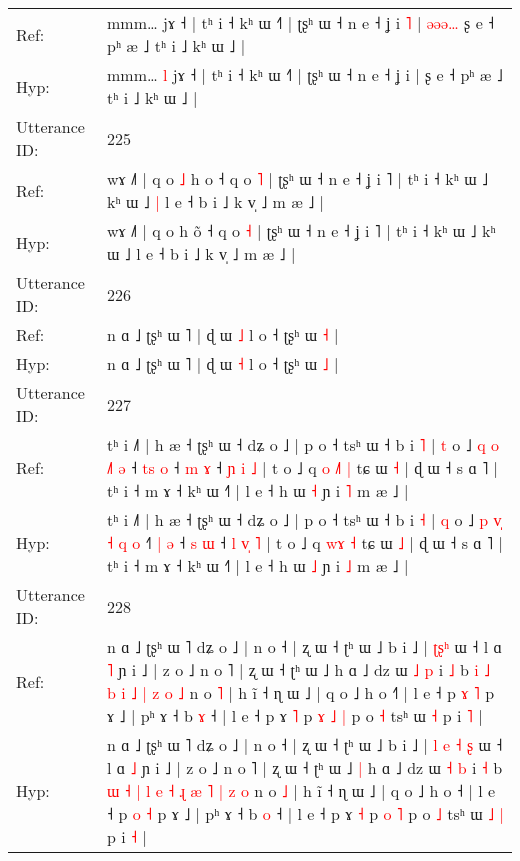 \documentclass[10pt]{article}
\DeclareRobustCommand{\hl}[1]{{\textcolor{red}{#1}}}
\begin{document}
\begin{longtable}{ll}
Ref: & mmm…\hl{}\hl{} jɤ ˧ | tʰ i ˧ kʰ ɯ ˧˥ | ʈʂʰ ɯ ˧ n e ˧ ʝ i\hl{ }\hl{˥} |\hl{ }\hl{ə}\hl{ə}\hl{ə}\hl{…} ʂ e ˧ pʰ æ ˩ tʰ i ˩ kʰ ɯ ˩ |
 \\
Hyp: & mmm…\hl{ }\hl{l} jɤ ˧ | tʰ i ˧ kʰ ɯ ˧˥ | ʈʂʰ ɯ ˧ n e ˧ ʝ i\hl{}\hl{} |\hl{}\hl{}\hl{}\hl{}\hl{} ʂ e ˧ pʰ æ ˩ tʰ i ˩ kʰ ɯ ˩ |
 \\
\midrule
Utterance ID: & 225 \\
Ref: & wɤ ˩˥ | q o\hl{ }\hl{˩} h o\hl{} ˧ q o \hl{˥} | ʈʂʰ ɯ ˧ n e ˧ ʝ i ˥ | tʰ i ˧ kʰ ɯ ˩ kʰ ɯ ˩\hl{ }\hl{|} l e ˧ b i ˩ k v̩ ˩ m æ ˩ |
 \\
Hyp: & wɤ ˩˥ | q o\hl{}\hl{} h o\hl{̃} ˧ q o \hl{˧} | ʈʂʰ ɯ ˧ n e ˧ ʝ i ˥ | tʰ i ˧ kʰ ɯ ˩ kʰ ɯ ˩\hl{}\hl{} l e ˧ b i ˩ k v̩ ˩ m æ ˩ |
 \\
\midrule
Utterance ID: & 226 \\
Ref: & n ɑ ˩ ʈʂʰ ɯ ˥ | ɖ ɯ \hl{˩} l o ˧ ʈʂʰ ɯ \hl{˧} |
 \\
Hyp: & n ɑ ˩ ʈʂʰ ɯ ˥ | ɖ ɯ \hl{˧} l o ˧ ʈʂʰ ɯ \hl{˩} |
 \\
\midrule
Utterance ID: & 227 \\
Ref: & tʰ i ˩˥ | h æ ˧ ʈʂʰ ɯ ˧ dʑ o ˩ | p o ˧ tsʰ ɯ ˧ b i \hl{˥} | \hl{t} o ˩ \hl{q} \hl{}\hl{o} \hl{}\hl{˩}\hl{˥} \hl{ə} ˧\hl{ }\hl{t}\hl{s} \hl{o} ˧ \hl{m} \hl{ɤ} ˧ \hl{ɲ} \hl{}\hl{i} \hl{˩} | t o ˩ q\hl{ }\hl{o} \hl{˩}\hl{˥} \hl{|} tɕ ɯ \hl{˧} | ɖ ɯ ˧ s ɑ ˥ | tʰ i ˧ m ɤ ˧ kʰ ɯ ˧˥ | l e ˧ h ɯ \hl{˧} ɲ i \hl{˥} m æ ˩ |
 \\
Hyp: & tʰ i ˩˥ | h æ ˧ ʈʂʰ ɯ ˧ dʑ o ˩ | p o ˧ tsʰ ɯ ˧ b i \hl{˧} | \hl{q} o ˩ \hl{p} \hl{v}\hl{̩} \hl{˧}\hl{ }\hl{q} \hl{o} ˧\hl{˥}\hl{ }\hl{|} \hl{ə} ˧ \hl{s} \hl{ɯ} ˧ \hl{l} \hl{v}\hl{̩} \hl{˥} | t o ˩ q\hl{}\hl{} \hl{w}\hl{ɤ} \hl{˧} tɕ ɯ \hl{˩} | ɖ ɯ ˧ s ɑ ˥ | tʰ i ˧ m ɤ ˧ kʰ ɯ ˧˥ | l e ˧ h ɯ \hl{˩} ɲ i \hl{˩} m æ ˩ |
 \\
\midrule
Utterance ID: & 228 \\
Ref: & n ɑ ˩ ʈʂʰ ɯ ˥ dʑ o ˩ | n o ˧ | ʐ ɯ ˧ ʈʰ ɯ ˩ b i ˩ |\hl{}\hl{}\hl{}\hl{} \hl{ʈ}\hl{ʂ}\hl{ʰ} ɯ ˧ l ɑ \hl{˥} ɲ i ˩ | z o ˩ n o ˥ | ʐ ɯ ˧ ʈʰ ɯ ˩\hl{}\hl{} h ɑ ˩ dz ɯ \hl{˩} \hl{p} i \hl{˩} b\hl{}\hl{}\hl{}\hl{}\hl{}\hl{} \hl{i} \hl{˩} \hl{b} \hl{i} \hl{˩} \hl{|} \hl{z} \hl{o} \hl{˩} n o \hl{˥} | h ĩ ˧ ɳ ɯ ˩ | q o ˩ h o ˧\hl{˥} | l e ˧ p \hl{ɤ} \hl{˥} p ɤ ˩ | pʰ ɤ ˧ b \hl{ɤ} ˧ | l e ˧ p ɤ \hl{˥} p\hl{ }\hl{ɤ} \hl{˩} \hl{|} p o \hl{˧} tsʰ ɯ\hl{}\hl{} \hl{˧} p i \hl{˥} |
 \\
Hyp: & n ɑ ˩ ʈʂʰ ɯ ˥ dʑ o ˩ | n o ˧ | ʐ ɯ ˧ ʈʰ ɯ ˩ b i ˩ |\hl{ }\hl{l}\hl{ }\hl{e} \hl{˧}\hl{ }\hl{ʂ} ɯ ˧ l ɑ \hl{˩} ɲ i ˩ | z o ˩ n o ˥ | ʐ ɯ ˧ ʈʰ ɯ ˩\hl{ }\hl{|} h ɑ ˩ dz ɯ \hl{˧} \hl{b} i \hl{˧} b\hl{ }\hl{ɯ}\hl{ }\hl{˧}\hl{ }\hl{|} \hl{l} \hl{e} \hl{˧} \hl{ɻ} \hl{æ} \hl{˥} \hl{|} \hl{z} \hl{o} n o \hl{˩} | h ĩ ˧ ɳ ɯ ˩ | q o ˩ h o ˧\hl{} | l e ˧ p \hl{o} \hl{˧} p ɤ ˩ | pʰ ɤ ˧ b \hl{o} ˧ | l e ˧ p ɤ \hl{˧} p\hl{}\hl{} \hl{o} \hl{˥} p o \hl{˩} tsʰ ɯ\hl{ }\hl{˩} \hl{|} p i \hl{˧} |

\end{longtable}
\end{document}

